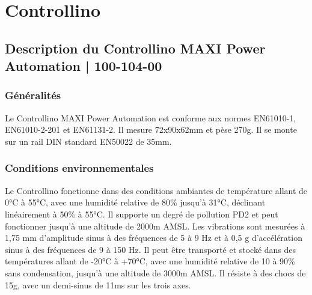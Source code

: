 \documentclass[a4paper,12pt]{report}
\begin{document}
\newpage
\listoffigures
{}
\nopagebreak
\noindent\begin{minipage}{\textwidth}
\listoftables
{}
\end{minipage}
\newpage

\chapter{\textbf{Controllino}}
\begin{center}
\label{}
\end{center}
\section{Description du Controllino MAXI Power Automation | 100-104-00}
\subsection{Généralités}
Le Controllino MAXI Power Automation est conforme aux normes EN61010-1, EN61010-2-201 et EN61131-2. Il mesure 72x90x62mm et pèse 270g. Il se monte sur un rail DIN standard EN50022 de 35mm.

\subsection{Conditions environnementales}
Le Controllino fonctionne dans des conditions ambiantes de température allant de 0°C à 55°C, avec une humidité relative de 80\% jusqu'à 31°C, déclinant linéairement à 50\% à 55°C. Il supporte un degré de pollution PD2 et peut fonctionner jusqu'à une altitude de 2000m AMSL. Les vibrations sont mesurées à 1,75 mm d'amplitude sinus à des fréquences de 5 à 9 Hz et à 0,5 g d'accélération sinus à des fréquences de 9 à 150 Hz. Il peut être transporté et stocké dans des températures allant de -20°C à +70°C, avec une humidité relative de 10 à 90\% sans condensation, jusqu'à une altitude de 3000m AMSL. Il résiste à des chocs de 15g, avec un demi-sinus de 11ms sur les trois axes.
\end{document}
